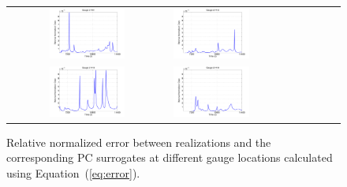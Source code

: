 \begin{figure}[ht]
\centering
\begin{tabular}{clc}        
\includegraphics[width=0.5\textwidth]{./figures/error_gauge1.pdf} &
\includegraphics[width=0.5\textwidth]{./figures/error_gauge2.pdf} \\
\includegraphics[width=0.5\textwidth]{./figures/error_gauge3.pdf} &
\includegraphics[width=0.5\textwidth]{./figures/error_gauge4.pdf} 

\end{tabular}
\caption{Relative normalized error between realizations and 
the corresponding PC surrogates at different gauge locations
calculated using Equation~(\ref{eq:error}).}
\label{fig:error}
\end{figure}   
